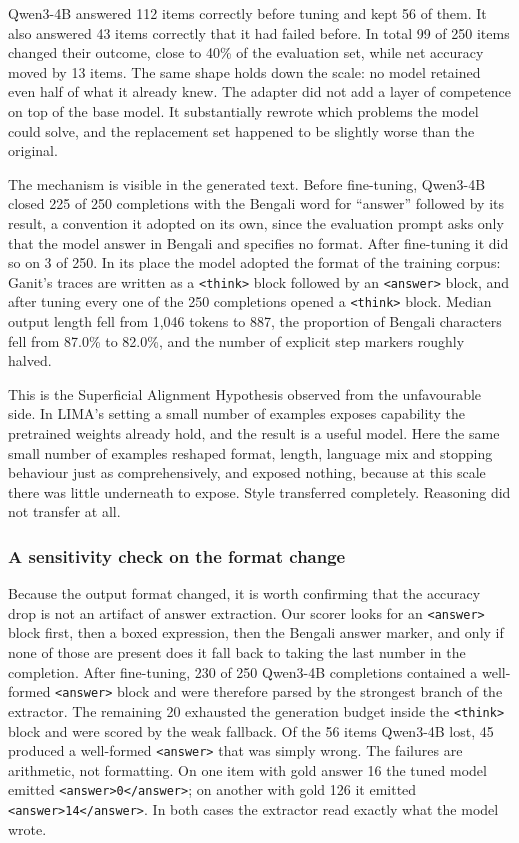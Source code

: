 \documentclass[10pt,twocolumn,letterpaper]{article}
\begin{document}
Qwen3-4B answered 112 items correctly before tuning and kept 56 of them. It
also answered 43 items correctly that it had failed before. In total 99 of 250
items changed their outcome, close to 40\% of the evaluation set, while net
accuracy moved by 13 items. The same shape holds down the scale: no model
retained even half of what it already knew. The adapter did not add a layer of
competence on top of the base model. It substantially rewrote which problems
the model could solve, and the replacement set happened to be slightly worse
than the original.

The mechanism is visible in the generated text. Before fine-tuning, Qwen3-4B
closed 225 of 250 completions with the Bengali word for ``answer'' followed by
its result, a convention it adopted on its own, since the evaluation prompt
asks only that the model answer in Bengali and specifies no format. After
fine-tuning it did so on 3 of 250. In its place the model adopted the format of
the training corpus: Ganit's traces are written as a \texttt{<think>} block
followed by an \texttt{<answer>} block, and after tuning every one of the 250
completions opened a \texttt{<think>} block. Median output length fell from
1,046 tokens to 887, the proportion of Bengali characters fell from 87.0\% to
82.0\%, and the number of explicit step markers roughly halved.

This is the Superficial Alignment Hypothesis \parencite{zhou2023lima} observed
from the unfavourable side. In LIMA's setting a small number of examples
exposes capability the pretrained weights already hold, and the result is a
useful model. Here the same small number of examples reshaped format, length,
language mix and stopping behaviour just as comprehensively, and exposed
nothing, because at this scale there was little underneath to expose. Style
transferred completely. Reasoning did not transfer at all.

\subsubsection*{A sensitivity check on the format change}

Because the output format changed, it is worth confirming that the accuracy
drop is not an artifact of answer extraction. Our scorer looks for an
\texttt{<answer>} block first, then a boxed expression, then the Bengali answer
marker, and only if none of those are present does it fall back to taking the
last number in the completion. After fine-tuning, 230 of 250 Qwen3-4B
completions contained a well-formed \texttt{<answer>} block and were therefore
parsed by the strongest branch of the extractor. The remaining 20 exhausted the
generation budget inside the \texttt{<think>} block and were scored by the weak
fallback. Of the 56 items Qwen3-4B lost, 45 produced a well-formed
\texttt{<answer>} that was simply wrong. The failures are arithmetic, not
formatting. On one item with gold answer 16 the tuned model emitted
\texttt{<answer>0</answer>}; on another with gold 126 it emitted
\texttt{<answer>14</answer>}. In both cases the extractor read exactly what the
model wrote.
\end{document}
